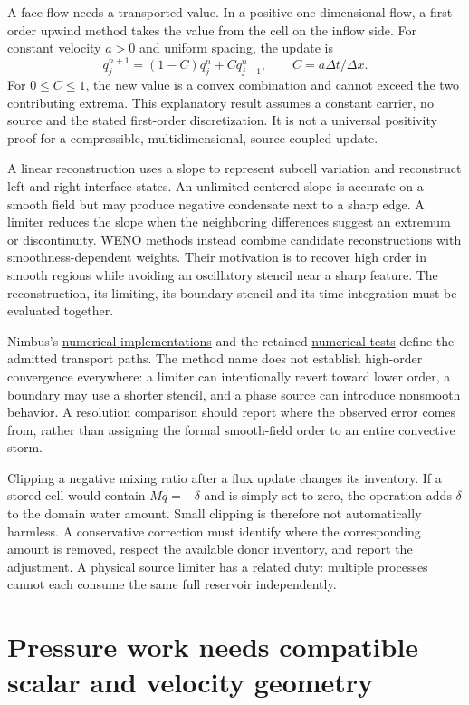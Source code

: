 A face flow needs a transported value. In a positive one-dimensional flow, a
first-order upwind method takes the value from the cell on the inflow side.
For constant velocity $a>0$ and uniform spacing, the update is
\[
 q_j^{n+1}=(1-C)q_j^n+Cq_{j-1}^n,
 \qquad C=a\Delta t/\Delta x.
\]
For $0\le C\le1$, the new value is a convex combination and cannot exceed the
two contributing extrema. This explanatory result assumes a constant carrier,
no source and the stated first-order discretization. It is not a universal
positivity proof for a compressible, multidimensional, source-coupled update.

A linear reconstruction uses a slope to represent subcell variation and
reconstruct left and right interface states. An unlimited centered slope is
accurate on a smooth field but may produce negative condensate next to a sharp
edge. A limiter reduces the slope when the neighboring differences suggest an
extremum or discontinuity. WENO methods instead combine candidate
reconstructions with smoothness-dependent weights. Their motivation is to
recover high order in smooth regions while avoiding an oscillatory stencil
near a sharp feature. The reconstruction, its limiting, its boundary stencil
and its time integration must be evaluated together.

Nimbus's \href{../src/numerics}{numerical implementations} and the retained
\href{../tests/numerics}{numerical tests} define the admitted transport paths.
The method name does not establish high-order convergence everywhere: a limiter
can intentionally revert toward lower order, a boundary may use a shorter
stencil, and a phase source can introduce nonsmooth behavior. A resolution
comparison should report where the observed error comes from, rather than
assigning the formal smooth-field order to an entire convective storm.

Clipping a negative mixing ratio after a flux update changes its inventory.
If a stored cell would contain $Mq=-\delta$ and is simply set to zero, the
operation adds $\delta$ to the domain water amount. Small clipping is therefore
not automatically harmless. A conservative correction must identify where the
corresponding amount is removed, respect the available donor inventory, and
report the adjustment. A physical source limiter has a related duty: multiple
processes cannot each consume the same full reservoir independently.

\section{Pressure work needs compatible scalar and velocity geometry}

